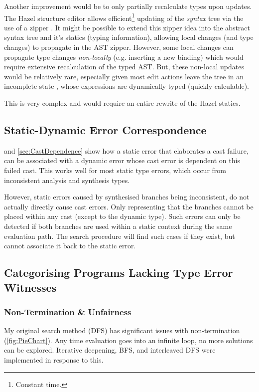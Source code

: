 Another improvement would be to only partially recalculate types upon updates. The Hazel structure editor allows efficient\footnote{Constant time.} updating of the \textit{syntax} tree via the use of a zipper \cite{HuetZipper, OneHoleContext}. It might be possible to extend this zipper idea into the abstract syntax tree and it's statics (typing information), allowing local changes (and type changes) to propagate in the AST zipper. However, some local changes can propagate type changes \textit{non-locally} (e.g. inserting a new binding) which would require extensive recalculation of the typed AST. But, these non-local updates would be relatively rare, especially given most edit actions leave the tree in an incomplete state \cite{IncompleteEditStates}, whose expressions are dynamically typed (quickly calculable). 

This is very complex and would require an entire rewrite of the Hazel statics.

  
\subsection{Static-Dynamic Error Correspondence}
 and \ref{sec:CastDependence} show how a static error that elaborates a cast failure, can be associated with a dynamic error whose cast error is dependent on this failed cast. This works well for most static type errors, which occur from inconsistent analysis and synthesis types.

However, static errors caused by synthesised branches being inconsistent, do not actually directly cause cast errors. Only representing that the branches cannot be placed within any cast (except to the dynamic type). Such errors can only be detected if both branches are used within a static context during the same evaluation path. The search procedure will find such cases if they exist, but cannot associate it back to the static error.
  
\subsection{Categorising Programs Lacking Type Error Witnesses}
\label{sec:SearchCategories}
\subsubsection{Non-Termination \& Unfairness}
My original search method (DFS) has significant issues with non-termination (\cref{fig:PieChart}). Any time evaluation goes into an infinite loop, no more solutions can be explored. Iterative deepening, BFS, and interleaved DFS were implemented in response to this.

